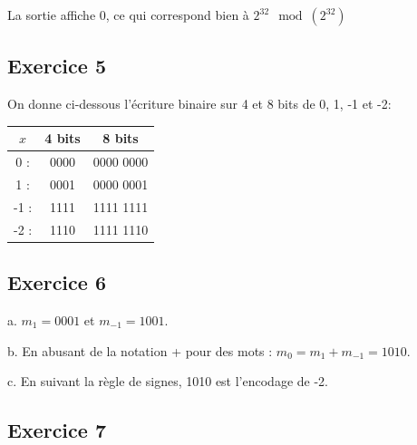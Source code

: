 \documentclass[a4 paper, 12pt]{article}
\begin{document}
La sortie affiche 0, ce qui correspond bien à $2^{32} \mod(2^{32})$

\subsection{Exercice 5}
On donne ci-dessous l'écriture binaire sur 4 et 8 bits de 0, 1, -1 et -2:
\begin{center}
    \begin{tabular}{c | c | c} 
    $x$ & 4 bits & 8 bits\\
        \hline
        \hline
    0 :& 0000 & 0000 0000\\ 
    1 :& 0001 & 0000 0001\\
    -1 :& 1111 & 1111 1111\\
    -2 :& 1110 & 1111 1110\\
     \hline
    \end{tabular}
\end{center}

\subsection{Exercice 6}
a. $m_1 = 0001$ et $m_{-1} = 1001$.

b. En abusant de la notation + pour des mots : $m_0 = m_1 + m_{-1} = 1010$.

c. En suivant la règle de signes, 1010 est l'encodage de -2.

\subsection{Exercice 7}
\end{document}

